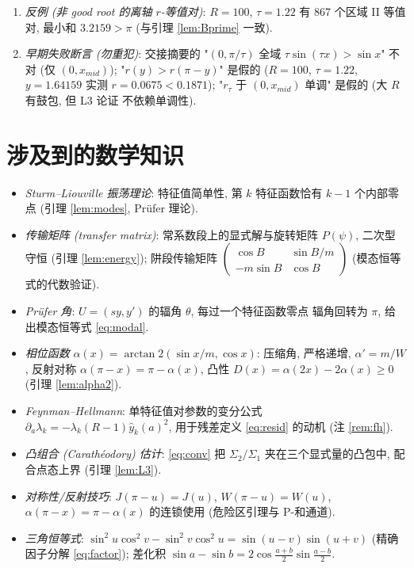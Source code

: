 \documentclass[UTF8]{ctexart}
\begin{document}
\begin{enumerate}
		$v^*=0.3825982567998447\ldots$: $A=B=1.45756580\in(x_{mid},\pi/\tau)$,
		$|R_1|<10^{-50}$, $\Sigma_2/\Sigma_1=\tau^2r(A)=\tau^2r(B)$ 到 $10^{-51}$
		(本会话复核).
	\item \emph{反例 (非 good root 的离轴 $r$-等值对)}: $R=100$, $\tau=1.22$ 有
		867 个区域 II 等值对, 最小和 $3.2159>\pi$ (与引理 \ref{lem:Bprime} 一致).
	\item \emph{早期失败断言 (勿重犯)}: 交接摘要的 "$(0,\pi/\tau)$ 全域
		$\tau\sin(\tau x)>\sin x$" 不对 (仅 $(0,x_{mid})$); "$r(y)>r(\pi-y)$"
		是假的 ($R=100$, $\tau=1.22$, $y=1.64159$ 实测 $r=0.0675<0.1871$);
		"$r_\tau$ 于 $(0,x_{mid})$ 单调" 是假的 (大 $R$ 有鼓包, 但 L3 论证
		不依赖单调性).
\end{enumerate}

\section{涉及到的数学知识}\label{sec:math}

\begin{itemize}
	\item \emph{Sturm--Liouville 振荡理论}: 特征值简单性, 第 $k$ 特征函数恰有
		$k-1$ 个内部零点 (引理 \ref{lem:modes}, Pr\"ufer 理论).
	\item \emph{传输矩阵 (transfer matrix)}: 常系数段上的显式解与旋转矩阵
		$P(\psi)$, 二次型守恒 (引理 \ref{lem:energy}); 阱段传输矩阵
		$\begin{pmatrix}\cos B&\sin B/m\\-m\sin B&\cos B\end{pmatrix}$
		(模态恒等式的代数验证).
	\item \emph{Pr\"ufer 角}: $U=(sy,y')$ 的辐角 $\theta$, 每过一个特征函数零点
		辐角回转为 $\pi$, 给出模态恒等式 \eqref{eq:modal}.
	\item \emph{相位函数} $\alpha(x)=\arctan2(\sin x/m,\cos x)$: 压缩角,
		严格递增, $\alpha'=m/W$, 反射对称 $\alpha(\pi-x)=\pi-\alpha(x)$,
		凸性 $D(x)=\alpha(2x)-2\alpha(x)\ge0$ (引理 \ref{lem:alpha2}).
	\item \emph{Feynman--Hellmann}: 单特征值对参数的变分公式
		$\partial_a\lambda_k=-\lambda_k(R-1)\hat y_k(a)^2$, 用于残差定义
		\eqref{eq:resid} 的动机 (注 \ref{rem:fh}).
	\item \emph{凸组合 (Carath\'eodory) 估计}: \eqref{eq:conv} 把 $\Sigma_2/\Sigma_1$
		夹在三个显式量的凸包中, 配合点态上界 (引理 \ref{lem:L3}).
	\item \emph{对称性/反射技巧}: $J(\pi-u)=J(u)$, $W(\pi-u)=W(u)$,
		$\alpha(\pi-x)=\pi-\alpha(x)$ 的连锁使用 (危险区引理与 P-和通道).
	\item \emph{三角恒等式}: $\sin^2u\cos^2v-\sin^2v\cos^2u
		=\sin(u-v)\sin(u+v)$ (精确因子分解 \eqref{eq:factor});
		差化积 $\sin a-\sin b=2\cos\frac{a+b}2\sin\frac{a-b}2$.
\end{itemize}
\end{document}
